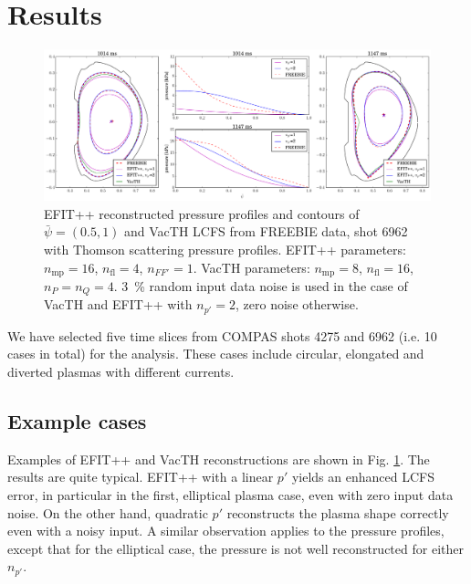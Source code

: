 
\section{Results} %
\label{sec:results}

\begin{figure}[!htb]
\centering   %
\hfill{}
\includegraphics[width=18cm]{example_6962.pdf}
\hfill{}
\caption{EFIT++ reconstructed pressure profiles and contours of $\bar\psi=\left(0.5,1\right)$ and VacTH LCFS from FREEBIE data, shot 6962 with Thomson scattering pressure profiles. EFIT++ parameters: $n_\mathrm{mp} = 16$, $n_\mathrm{fl} = 4$, $n_{FF'} = 1$. VacTH parameters: $n_\mathrm{mp} = 8$, $n_\mathrm{fl} = 16$, $n_P = n_Q = 4$. 3~\% random input data noise is used in the case of VacTH and EFIT++ with $n_{p'} = 2$, zero noise otherwise.}
\label{fig:ex6962}
\end{figure}


We have selected five time slices from COMPAS shots 4275 and 6962 (i.e. 10 cases in total) for the analysis. These cases include circular, elongated and diverted plasmas with different currents. 

\subsection{Example cases}

Examples of EFIT++ and VacTH reconstructions are shown in Fig. \ref{fig:ex6962}. The results are quite typical. EFIT++ with a linear $p'$ yields an enhanced LCFS error, in particular in the first, elliptical plasma case, even with zero input data noise. On the other hand, quadratic $p'$ reconstructs the plasma shape correctly even with a noisy input. A similar observation applies to the pressure profiles, except that for the elliptical case, the pressure is not well reconstructed for either $n_{p'}$. 

